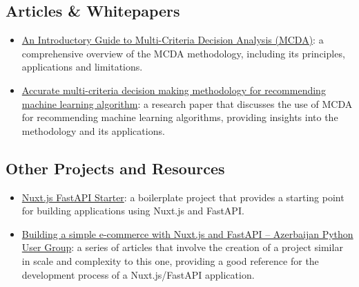 \documentclass[11pt,italian,a4paper]{article}
\begin{document}
\subsection{Articles \& Whitepapers}
\begin{itemize}
    \item \href{https://analysisfunction.civilservice.gov.uk/policy-store/an-introductory-guide-to-mcda/}{An Introductory Guide to Multi-Criteria Decision Analysis (MCDA)}: a comprehensive overview of the MCDA methodology, including its principles, applications and limitations.
    \item \href{https://www.sciencedirect.com/science/article/pii/S0957417416306698}{Accurate multi-criteria decision making methodology for recommending machine learning algorithm}: a research paper that discusses the use of MCDA for recommending machine learning algorithms, providing insights into the methodology and its applications.
\end{itemize}

\subsection{Other Projects and Resources}
\begin{itemize}
    \item \href{https://github.com/TutorFx/nuxtjs-fastapi}{Nuxt.js FastAPI Starter}: a boilerplate project that provides a starting point for building applications using Nuxt.js and FastAPI.
    \item \href{https://www.azepug.az/posts/fastapi/#building-simple-e-commerce-with-nuxtjs-and-fastapi-series}{Building a simple e-commerce with Nuxt.js and FastAPI -- Azerbaijan Python User Group}: a series of articles that involve the creation of a project similar in scale and complexity to this one, providing a good reference for the development process of a Nuxt.js/FastAPI application.
\end{itemize}
\end{document}
